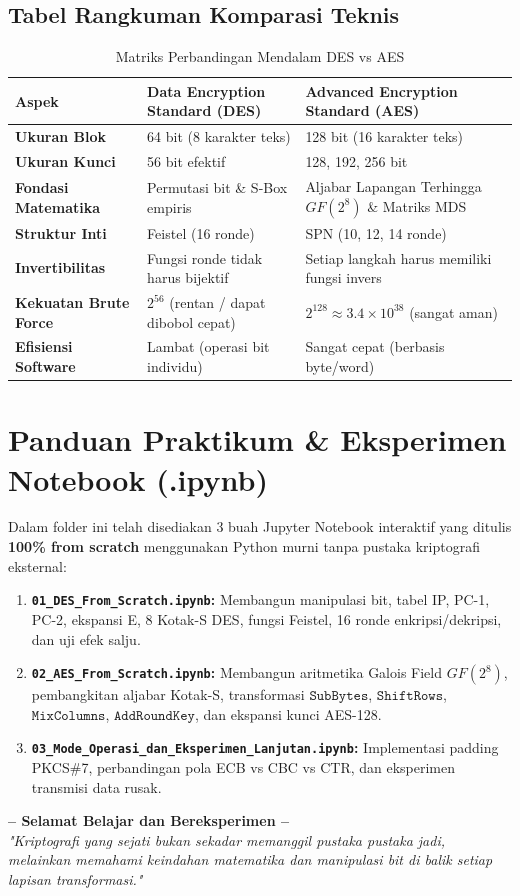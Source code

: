 \documentclass[11pt,a4paper]{article}
\begin{document}
\subsection{Tabel Rangkuman Komparasi Teknis}
\begin{table}[H]
\centering
\caption{Matriks Perbandingan Mendalam DES vs AES}
\label{tab:deep_comparison}
\vspace{0.2cm}
\begin{tabular}{p{3.8cm}p{5.5cm}p{5.5cm}}
\toprule
\textbf{Aspek} & \textbf{Data Encryption Standard (DES)} & \textbf{Advanced Encryption Standard (AES)} \\
\midrule
\textbf{Ukuran Blok} & 64 bit (8 karakter teks) & 128 bit (16 karakter teks) \\
\textbf{Ukuran Kunci} & 56 bit efektif & 128, 192, 256 bit \\
\textbf{Fondasi Matematika} & Permutasi bit \& S-Box empiris & Aljabar Lapangan Terhingga $GF(2^8)$ \& Matriks MDS \\
\textbf{Struktur Inti} & Feistel (16 ronde) & SPN (10, 12, 14 ronde) \\
\textbf{Invertibilitas} & Fungsi ronde tidak harus bijektif & Setiap langkah harus memiliki fungsi invers \\
\textbf{Kekuatan Brute Force} & $2^{56}$ (rentan / dapat dibobol cepat) & $2^{128} \approx 3.4 \times 10^{38}$ (sangat aman) \\
\textbf{Efisiensi Software} & Lambat (operasi bit individu) & Sangat cepat (berbasis byte/word) \\
\bottomrule
\end{tabular}
\end{table}

\section{Panduan Praktikum \& Eksperimen Notebook (.ipynb)}
Dalam folder ini telah disediakan 3 buah Jupyter Notebook interaktif yang ditulis \textbf{100\% from scratch} menggunakan Python murni tanpa pustaka kriptografi eksternal:
\begin{enumerate}[leftmargin=*]
    \item \textbf{\texttt{01\_DES\_From\_Scratch.ipynb}:}
    Membangun manipulasi bit, tabel IP, PC-1, PC-2, ekspansi E, 8 Kotak-S DES, fungsi Feistel, 16 ronde enkripsi/dekripsi, dan uji efek salju.
    \item \textbf{\texttt{02\_AES\_From\_Scratch.ipynb}:}
    Membangun aritmetika Galois Field $GF(2^8)$, pembangkitan aljabar Kotak-S, transformasi $\mathtt{SubBytes}$, $\mathtt{ShiftRows}$, $\mathtt{MixColumns}$, $\mathtt{AddRoundKey}$, dan ekspansi kunci AES-128.
    \item \textbf{\texttt{03\_Mode\_Operasi\_dan\_Eksperimen\_Lanjutan.ipynb}:}
    Implementasi padding PKCS\#7, perbandingan pola ECB vs CBC vs CTR, dan eksperimen transmisi data rusak.
\end{enumerate}

\vspace{0.5cm}
\begin{center}
\textbf{-- Selamat Belajar dan Bereksperimen --}\\
\textit{"Kriptografi yang sejati bukan sekadar memanggil pustaka pustaka jadi, melainkan memahami keindahan matematika dan manipulasi bit di balik setiap lapisan transformasi."}
\end{center}
\end{document}
